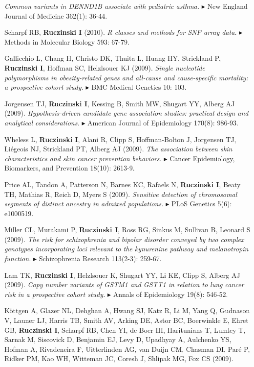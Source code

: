 \documentclass[10pt]{article}
\newcommand{\mine}{
  \addtocounter{enumi}{1}
\item[\fcolorbox{white}{grey}{\color{white} \tiny \arabic{enumi}}]
}
\newcommand{\dg}[1]{{\color{black} $\blacktriangleright$ {#1}}}
\begin{document}
{\it Common variants in DENND1B associate with pediatric asthma.} 
\dg{New England Journal of Medicine} 362(1): 36-44.
\mine                       
Scharpf RB, {\bf Ruczinski I} (2010).
{\it R classes and methods for SNP array data.}
\dg{Methods in Molecular Biology} 593: 67-79. 
\item
Gallicchio L, Chang H, Christo DK, Thuita L, Huang HY, Strickland P, {\bf Ruczinski I}, Hoffman SC, Helzlsouer KJ (2009).
{\it Single nucleotide polymorphisms in obesity-related genes and all-cause and cause-specific mortality: a prospective cohort study.}
\dg{BMC Medical Genetics} 10: 103.
\item
Jorgensen TJ, {\bf Ruczinski I}, Kessing B, Smith MW, Shugart YY, Alberg AJ (2009).
{\it Hypothesis-driven candidate gene association studies: practical design and analytical considerations.}
\dg{American Journal of Epidemiology} 170(8): 986-93.
\item
Wheless L, {\bf Ruczinski I}, Alani R, Clipp S, Hoffman-Bolton J, Jorgensen TJ, Li\'egeois NJ, Strickland PT, Alberg AJ (2009).
{\it The association between skin characteristics and skin cancer prevention behaviors.}
\dg{Cancer Epidemiology, Biomarkers, and Prevention} 18(10): 2613-9. 
\item
Price AL, Tandon A, Patterson N, Barnes KC, Rafaels N, {\bf Ruczinski I}, Beaty TH, Mathias R, Reich D, Myers S (2009).
{\it Sensitive detection of chromosomal segments of distinct ancestry in admixed populations.}
\dg{PLoS Genetics} 5(6): e1000519.
\item
Miller CL, Murakami P, {\bf Ruczinski I}, Ross RG, Sinkus M, Sullivan B, Leonard S (2009).
{\it The risk for schizophrenia and bipolar disorder conveyed by two complex genotypes incorporating loci relevant to the kynurenine pathway and melanotropin function.}
\dg{Schizophrenia Research} 113(2-3): 259-67.
\item
Lam TK, {\bf Ruczinski I}, Helzlsouer K, Shugart YY, Li KE, Clipp S, Alberg AJ (2009).
{\it Copy number variants of GSTM1 and GSTT1 in relation to lung cancer risk in a prospective cohort study.} 
\dg{Annals of Epidemiology} 19(8): 546-52.
\item
K\"ottgen A, Glazer NL, Dehghan A, Hwang SJ, Katz R, Li M, Yang Q, Gudnason V, Launer LJ, Harris TB, Smith AV, Arking DE, Astor BC, Boerwinkle E, Ehret GB, {\bf Ruczinski I}, Scharpf RB, Chen YI, de Boer IH, Haritunians T, Lumley T, Sarnak M, Siscovick D, Benjamin EJ, Levy D, Upadhyay A, Aulchenko YS, Hofman A, Rivadeneira F, Uitterlinden AG, van Duijn CM, Chasman DI, Par\'e P, Ridker PM,  Kao WH, Witteman JC, Coresh J, Shlipak MG, Fox CS (2009).
\end{document}
